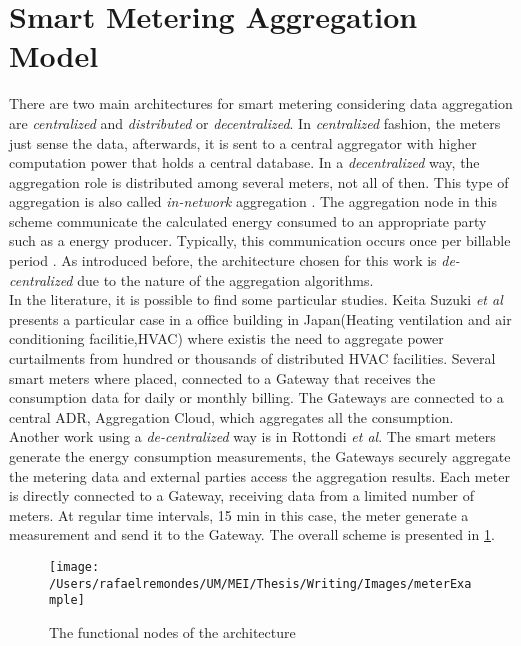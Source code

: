 \section{Smart Metering Aggregation Model} 
There are two main architectures for smart metering considering data aggregation  are \textit{centralized} and \textit{distributed} or \textit{ decentralized}\cite{journals/spm/ErkinTLP13}. In \textit{centralized} fashion, the meters just sense the data, afterwards, it is sent to a central aggregator with higher computation power that holds a central database. In a \textit{decentralized} way, the aggregation role is distributed among several meters, not all of then. This type of aggregation is also called  \textit{in-network} aggregation \cite{Girao2004c}\cite{Castelluccia05efficientaggregation}. The aggregation node in this scheme communicate the calculated energy consumed to an appropriate party such as a energy producer. Typically, this communication occurs once per billable period \cite{journals/spm/ErkinTLP13}. As introduced before, the architecture chosen for this work is \textit{de-centralized} due to the nature of the aggregation algorithms.\\
In the literature, it is possible to find some particular studies. Keita Suzuki \textit{et al} \cite{DBLP:conf/isgteurope/SuzukiNYKMKA13}  presents a particular case in a office building in Japan(Heating ventilation and air conditioning facilitie,HVAC) where existis the need to aggregate power curtailments from hundred or thousands of distributed HVAC facilities. Several smart meters where placed, connected to a Gateway that receives the consumption data for daily or monthly billing.  The Gateways are connected to a central ADR, Aggregation Cloud, which aggregates all the consumption.\\
Another work using a \textit{de-centralized} way is in Rottondi \textit{et al}\cite{rottondi2012}.  The smart meters generate the energy consumption measurements, the Gateways securely aggregate the metering data and external parties access the aggregation results. Each meter is directly connected to a Gateway, receiving data from a limited number of meters. At regular time intervals, 15 min in this case, the meter generate a measurement and send it to the Gateway. The overall scheme is presented in \ref{fig:meterArchitecture}.
\begin{figure}[h]
\centering
\texttt{[image: /Users/rafaelremondes/UM/MEI/Thesis/Writing/Images/meterExample]}
\caption{\label{fig:meterArchitecture} The functional nodes of the architecture}
\end{figure}

